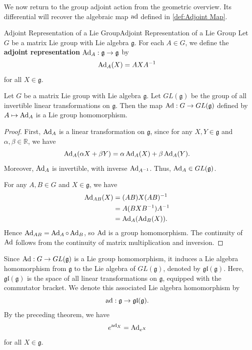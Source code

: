 \documentclass[../main.tex]{subfiles}
\begin{document}
We now return to the group adjoint action from the geometric overview. Its differential will recover the algebraic map $\operatorname{ad}$ defined in \ref{def:Adjoint Map}.

\begin{definition}{Adjoint Representation of a Lie Group}{Adjoint Representation of a Lie Group}
  Let $G$ be a matrix Lie group with Lie algebra $\mathfrak{g}$. For each $A \in G$, we define the \textbf{adjoint representation} $\operatorname{Ad}_A: \mathfrak{g} \to \mathfrak{g}$ by
  \begin{equation}
    \operatorname{Ad}_A(X) = A X A^{-1}
  \end{equation}
  for all $X \in \mathfrak{g}$.
\end{definition}

\begin{proposition}{}{}
  Let $G$ be a matrix Lie group with Lie algebra $\mathfrak{g}$. Let $GL(\mathfrak{g})$ be the group of all invertible linear transformations on $\mathfrak{g}$. Then the map $\operatorname{Ad}: G \to GL(\mathfrak{g})$ defined by $A \mapsto \operatorname{Ad}_A$ is a Lie group homomorphism.
\end{proposition}

\begin{proof}
  First, $\operatorname{Ad}_A$ is a linear transformation on $\mathfrak{g}$, since for any $X,Y\in\mathfrak{g}$ and $\alpha,\beta\in\mathbb{R}$, we have
  \begin{equation*}
    \operatorname{Ad}_A(\alpha X+\beta Y)=\alpha\operatorname{Ad}_A(X)+\beta\operatorname{Ad}_A(Y).
  \end{equation*}
  Moreover, $\operatorname{Ad}_A$ is invertible, with inverse $\operatorname{Ad}_{A^{-1}}$. Thus, $\operatorname{Ad}_A\in GL(\mathfrak{g})$.

  For any $A,B\in G$ and $X\in\mathfrak{g}$, we have
  \begin{equation*}
    \begin{aligned}
      \operatorname{Ad}_{AB}(X)&=(AB)X(AB)^{-1}\\
      &=A(BXB^{-1})A^{-1}\\
      &=\operatorname{Ad}_A(\operatorname{Ad}_B(X)).
    \end{aligned}
  \end{equation*}
  Hence $\operatorname{Ad}_{AB}=\operatorname{Ad}_A\circ\operatorname{Ad}_B$, so $\operatorname{Ad}$ is a group homomorphism. The continuity of $\operatorname{Ad}$ follows from the continuity of matrix multiplication and inversion.
\end{proof}

Since $\operatorname{Ad}:G\to GL(\mathfrak{g})$ is a Lie group homomorphism, it induces a Lie algebra homomorphism from $\mathfrak{g}$ to the Lie algebra of $GL(\mathfrak{g})$, denoted by $\mathfrak{gl}(\mathfrak{g})$. Here, $\mathfrak{gl}(\mathfrak{g})$ is the space of all linear transformations on $\mathfrak{g}$, equipped with the commutator bracket. We denote this associated Lie algebra homomorphism by
\begin{equation}
  \operatorname{ad}:\mathfrak{g}\to\mathfrak{gl}(\mathfrak{g}).
\end{equation}
By the preceding theorem, we have
\begin{equation}
  e^{\operatorname{ad}_X}=\operatorname{Ad}_{e^X}
\end{equation}
for all $X\in\mathfrak{g}$.
\end{document}
